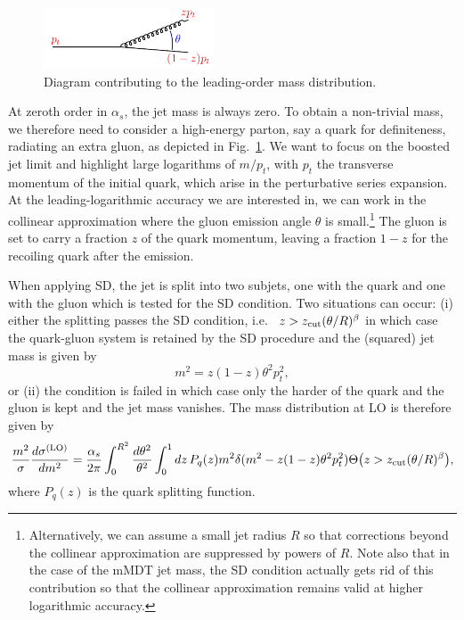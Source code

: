 \begin{figure}[t!]
  \centerline{\includegraphics[width=0.45\textwidth]{figures/q2qg.pdf}}
  \caption{Diagram contributing to the leading-order mass
    distribution.}\label{fig:mmdt-mass-one-gluon}  
\end{figure}

At zeroth order in $\alpha_s$, the jet mass is always zero. To obtain
a non-trivial mass, we therefore need to consider a high-energy
parton, say a quark for definiteness, radiating an extra gluon, as
depicted in Fig.~\ref{fig:mmdt-mass-one-gluon}.
%
We want to focus on the boosted jet limit and highlight large
logarithms of $m/p_t$, with $p_t$ the transverse momentum of the
initial quark, which arise in the perturbative series expansion.
%
At the leading-logarithmic accuracy we are interested in, we can work
in the collinear approximation where the gluon emission angle $\theta$
is small.\footnote{Alternatively, we can assume a small jet radius $R$
  so that corrections beyond the collinear approximation are
  suppressed by powers of $R$. Note also that in the case of the mMDT
  jet mass, the SD condition actually gets rid of this
  contribution so that the collinear approximation remains valid at
  higher logarithmic accuracy.}
%
The gluon is set to carry a fraction $z$ of the quark momentum,
leaving a fraction $1-z$ for the recoiling quark after the emission.


When applying SD, the jet is split into two subjets, one
with the quark and one with the gluon which is tested for the
SD condition. Two situations can occur: (i) either the splitting
passes the SD condition, i.e. \ $z>z_{\text{cut}} (\theta/R)^\beta$ in
which case the quark-gluon system is retained by the SD procedure
and the (squared) jet mass is given by
\begin{equation}\label{eq:mmdt-qg-mass}
m^2 = z(1-z)\theta^2 p_t^2,
\end{equation}
or (ii) the condition is failed in which case only the harder of the quark
and the gluon is kept and the jet mass vanishes.
%
The mass distribution at LO is therefore given by
\begin{equation}\label{eq:mmdt-lo-full}
  \frac{m^2}{\sigma}\frac{d\sigma^{\text{(LO)}}}{dm^2}
  = \frac{\alpha_s}{2\pi} \int_0^{R^2}\frac{d\theta^2}{\theta^2}\int_0^1dz\,P_q(z)
  m^2\delta(m^2-z(1-z)\theta^2 p_t^2)\Theta\big(z>z_{\text{cut}}(\theta/R)^\beta\big),
\end{equation}
where $P_q(z)$ is the quark splitting function.

